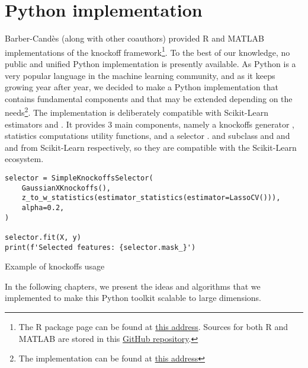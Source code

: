 \section{Python implementation}\label{sec:python_implementation}

Barber-Candès (along with other coauthors) provided R and MATLAB implementations
of the knockoff framework\footnote{
    The R package page can be found at
    \href{https://cran.r-project.org/web/packages/knockoff/index.html}{this address}.
    Sources for both R and MATLAB are stored in this
    \href{https://github.com/msesia/knockoff-filter}{GitHub repository}.
}.
To the best of our knowledge, no public and unified Python implementation is presently available.
As Python is a very popular language in the machine learning community,
and as it keeps growing year after year,
we decided to make a Python implementation that contains fundamental components and that may be extended
depending on the needs\footnote{
    The implementation can be found at
    \href{}{this address}
}.
The implementation is deliberately compatible with Scikit-Learn~\cite{sklearn} estimators and .
It provides 3 main components,
namely a knockoffs generator ,
statistics computations utility functions,
and a selector .
 and  subclass  and 
and  and  from Scikit-Learn respectively,
so they are compatible with the Scikit-Learn ecosystem.
\begin{calgorithm}
\begin{verbatim}
selector = SimpleKnockoffsSelector(
    GaussianXKnockoffs(),
    z_to_w_statistics(estimator_statistics(estimator=LassoCV())),
    alpha=0.2,
)

selector.fit(X, y)
print(f'Selected features: {selector.mask_}')
\end{verbatim}
\caption{
    Example of knockoffs usage
}\label{code:python_knockoffs}
\end{calgorithm}

\bigbreak
In the following chapters,
we present the ideas and algorithms that we implemented to make this Python toolkit scalable to large dimensions.
